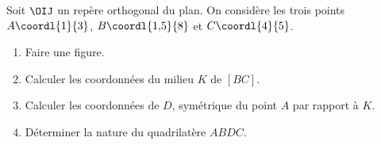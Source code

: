 \begin{exo}
	Soit $\OIJ$ un repère orthogonal du plan. On considère les trois points $A\coordl{1}{3}$, $B\coordl{1{,}5}{8}$ et $C\coordl{4}{5}$.
	\begin{enumerate}
		\item Faire une figure.
		\item Calculer les coordonnées du milieu $K$ de $[BC]$.
		\item Calculer les coordonnées de $D$, symétrique du point $A$ par rapport à $K$.
		\item Déterminer la nature du quadrilatère $ABDC$.
	\end{enumerate}
\end{exo}
